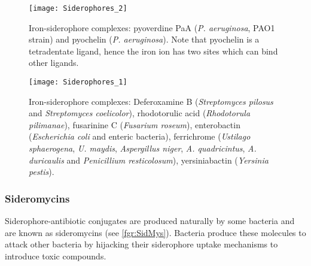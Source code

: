 \begin{figure}[H]
	\begin{center}
		\texttt{[image: Siderophores\_2]}
		\caption{Iron-siderophore complexes:
		pyoverdine PaA \cite{Zheng2012,Meyer2000} (\textit{P. aeruginosa}, PAO1 strain) and pyochelin \cite{Schlegel2006,Cobessi2005} (\textit{P. aeruginosa}). 
		Note that pyochelin  is a tetradentate ligand, hence the iron ion has two sites which can bind other ligands. \label{fgr:Sids_2}}
	\end{center}
\end{figure}

\begin{figure}[H]
	\begin{center}
		\texttt{[image: Siderophores\_1]}
		\caption{Iron-siderophore complexes:
		Deferoxamine B \cite{Zheng2012} (\textit{Streptomyces pilosus} and \textit{Streptomyces coelicolor}), 
		rhodotorulic acid \cite{Carrano1978} (\textit{Rhodotorula pilimanae}),
		fusarinine C \cite{Hossain1980} (\textit{Fusarium roseum}),
		enterobactin \cite{Zheng2012} (\textit{Escherichia coli} and enteric bacteria),
		ferrichrome \cite{vanderHelm1980} (\textit{Ustilago sphaerogena}, \textit{U. maydis}, \textit{Aspergillus niger}, \textit{A. quadricintus}, \textit{A. duricaulis} and \textit{Penicillium resticolosum}),
		yersiniabactin \cite{Zheng2012} (\textit{Yersinia pestis}).
		\label{fgr:Sids}}
	\end{center}
\end{figure}



\subsubsection{Sideromycins}

Siderophore-antibiotic conjugates are produced naturally by some bacteria and are known as sideromycins\cite{Page2013} (see \ref{fgr:SidMys}). Bacteria produce these molecules to attack other bacteria by hijacking their siderophore uptake mechanisms to introduce toxic compounds. 

